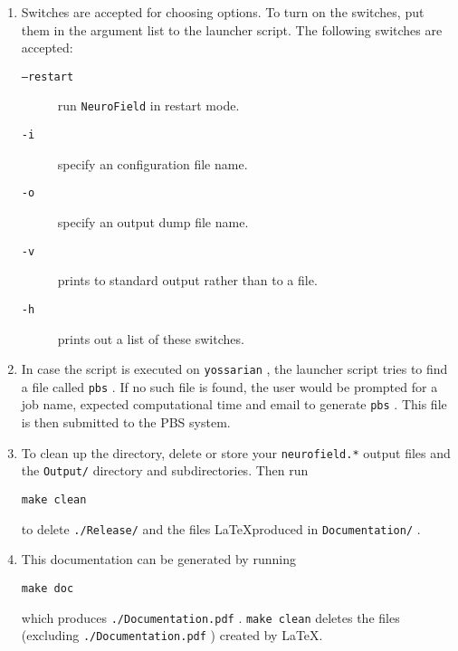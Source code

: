 \documentclass[12pt,a4paper]{article}
\newcommand{\type}[1]{ {\small\small\tt #1} }
\newcommand{\NF}[0]{ \type{NeuroField}}
\begin{document}
\begin{enumerate}
\item Switches are accepted for choosing options. To turn on the switches, put them in the argument list to the launcher script. The following switches are accepted:
	\begin{description}
	\item[\type{--restart}] run \NF in restart mode.
	\item[\type{-i}] specify an configuration file name.
	\item[\type{-o}] specify an output dump file name.
	\item[\type{-v}] prints to standard output rather than to a file.
	\item[\type{-h}] prints out a list of these switches.
	\end{description}

\item In case the script is executed on \type{yossarian}, the launcher script tries to find a file called \type{pbs}. If no such file is found, the user would be prompted for a job name, expected computational time and email to generate \type{pbs}. This file is then submitted to the PBS system.

\item To clean up the directory, delete or store your \type{neurofield.*} output files and the \type{Output/} directory and subdirectories. Then run
\begin{lstlisting}
make clean
\end{lstlisting}
to delete \type{./Release/} and the files \LaTeX produced in \type{Documentation/}.

\item This documentation can be generated by running 
\begin{lstlisting}
make doc
\end{lstlisting}
which produces \type{./Document\-ation.pdf}. \type{make clean} deletes the files (excluding \type{./Document\-ation.pdf}) created by \LaTeX.

\end{enumerate}


\end{document}
